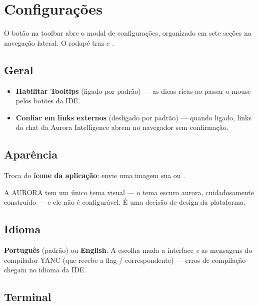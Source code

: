 \chapter{Configurações}
\label{cap:configuracoes}

O botão  na toolbar abre o modal de configurações, organizado em sete seções na navegação lateral. O rodapé traz  e .


\section{Geral}

\begin{itemize}
  \item \textbf{Habilitar Tooltips} (ligado por padrão) --- as dicas ricas ao passar o mouse pelos botões da IDE.
  \item \textbf{Confiar em links externos} (desligado por padrão) --- quando ligado, links do chat da Aurora Intelligence abrem no navegador sem confirmação.
\end{itemize}

\section{Aparência}

Troca do \textbf{ícone da aplicação}: envie uma imagem sua ou .

\begin{info}
A AURORA tem um único tema visual --- o tema escuro aurora, cuidadosamente construído --- e ele não é configurável. É uma decisão de design da plataforma.
\end{info}

\section{Idioma}

\textbf{Português} (padrão) ou \textbf{English}. A escolha muda a interface \emph{e} as mensagens do compilador YANC (que recebe a flag / correspondente) --- erros de compilação chegam no idioma da IDE.

\section{Terminal}

